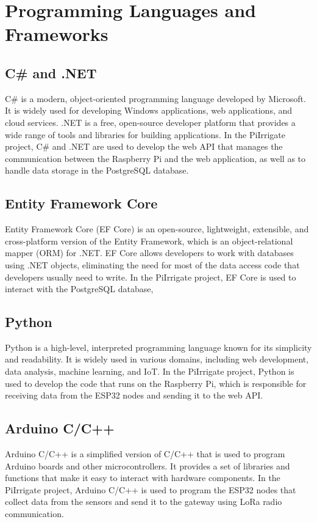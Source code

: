 \section{Programming Languages and Frameworks}
\subsection{C\# and .NET}
C\# is a modern, object-oriented programming language developed by Microsoft.
It is widely used for developing Windows applications, web applications, and cloud services.
.NET is a free, open-source developer platform that provides a wide range of tools and libraries 
for building applications.
In the PiIrrigate project, C\# and .NET are used to develop the web API that manages the communication
between the Raspberry Pi and the web application, as well as to handle data storage in the PostgreSQL database.

\subsection{Entity Framework Core}
Entity Framework Core (EF Core) is an open-source, lightweight, extensible, and cross-platform version 
of the Entity Framework, which is an object-relational mapper (ORM) for .NET.
EF Core allows developers to work with databases using .NET objects, eliminating the need for 
most of the data access code that developers usually need to write.
In the PiIrrigate project, EF Core is used to interact with the PostgreSQL database,

\subsection{Python}
Python is a high-level, interpreted programming language known for its simplicity and readability.
It is widely used in various domains, including web development, data analysis, machine learning, and IoT.
In the PiIrrigate project, Python is used to develop the code that runs on the Raspberry Pi,
which is responsible for receiving data from the ESP32 nodes and sending it to the web API.

\subsection{Arduino C/C++}
Arduino C/C++ is a simplified version of C/C++ that is used to program Arduino 
boards and other microcontrollers.
It provides a set of libraries and functions that make it easy to interact with hardware components.
In the PiIrrigate project, Arduino C/C++ is used to program the ESP32 nodes that collect data from the sensors
and send it to the gateway using LoRa radio communication.

